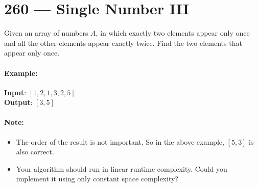 \section{260 --- Single Number III}
Given an array of numbers $A$, in which exactly two elements appear only once and all the other elements appear exactly twice. Find the two elements that appear only once.

\paragraph{Example:}

\begin{flushleft}
\textbf{Input}:  $[1,2,1,3,2,5]$
\\
\textbf{Output}: $[3,5]$
\end{flushleft}

\paragraph{Note:}

\begin{itemize}
\item The order of the result is not important. So in the above example, $[5, 3]$ is also correct.
\item Your algorithm should run in linear runtime complexity. Could you implement it using only constant space complexity?
\end{itemize}
